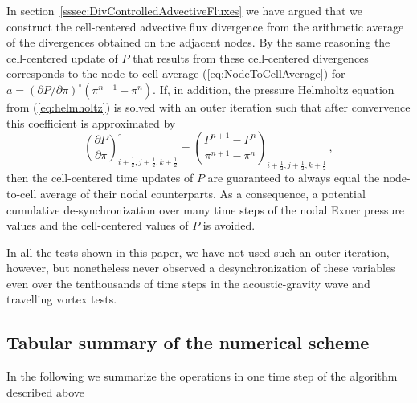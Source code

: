 \documentclass{ametsoc}
\theoremstyle{definition}
\newcommand{\eq}[1]{(\ref{#1})}
\newcommand{\halff}{\frac{1}{2}}
\begin{document}
In section~\ref{sssec:DivControlledAdvectiveFluxes} we have argued that
we construct the cell-centered advective flux divergence from the arithmetic
average of the divergences obtained on the adjacent nodes. By the same 
reasoning the cell-centered update of $P$ that results
from these cell-centered divergences corresponds to the node-to-cell average 
\eq{eq:NodeToCellAverage} for 
$a = (\partial P/\partial \pi)^{\circ} (\pi^{n+1}-\pi^{n})$.
If, in addition, the pressure Helmholtz equation from \eq{eq:helmholtz} is
solved with an outer iteration such that after convervence this coefficient
is approximated by  
%
\begin{equation}
\left(\frac{\partial P}{\partial \pi}\right)^{\circ}_{i+\halff,j+\halff,k+\halff}
= \left(\frac{P^{n+1} - P^{n}}{\pi^{n+1} - \pi^{n}}\right)_{i+\halff,j+\halff,k+\halff}\,,
\end{equation}
%
then the cell-centered time updates of $P$ are guaranteed to always equal the
node-to-cell average of their nodal counterparts. As a consequence, a potential
cumulative de-synchronization over many time steps of the nodal Exner pressure 
values and the cell-centered values of $P$ is avoided. 

In all the tests shown in this paper, we have not used such an outer iteration, 
however, but nonetheless never observed a desynchronization of these variables 
even over the tenthousands of time steps in the acoustic-gravity wave and 
travelling vortex tests. 



\subsection{Tabular summary of the numerical scheme}

In the following we summarize the operations in one time step of the algorithm described above%

\vspace{2 mm}

\newpage
\end{document}
